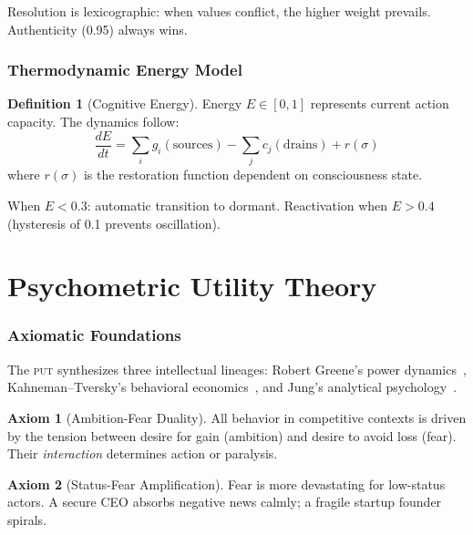 \documentclass[12pt,a4paper,twoside]{article}
\theoremstyle{plain}
\theoremstyle{definition}
\newtheorem{definition}[theorem]{Definition}
\newtheorem{axiom}{Axiom}
\theoremstyle{remark}
\newcommand{\PUT}{\textsc{put}}
\begin{document}
Resolution is lexicographic: when values conflict, the higher weight prevails. Authenticity (0.95) always wins.


\section{Thermodynamic Energy Model}

\begin{definition}[Cognitive Energy]
Energy $E \in [0,1]$ represents current action capacity. The dynamics follow:
\begin{equation}
\frac{dE}{dt} = \sum_i g_i(\text{sources}) - \sum_j c_j(\text{drains}) + r(\sigma)
\end{equation}
where $r(\sigma)$ is the restoration function dependent on consciousness state.
\end{definition}

When $E < 0.3$: automatic transition to dormant. Reactivation when $E > 0.4$ (hysteresis of 0.1 prevents oscillation).



\part{Psychometric Utility Theory}

\section{Axiomatic Foundations}

The \PUT{} synthesizes three intellectual lineages: Robert Greene's power dynamics~\citep{greene1998,greene2018}, Kahneman--Tversky's behavioral economics~\citep{kahneman1979,tversky1992}, and Jung's analytical psychology~\citep{jung1951}.

\begin{axiom}[Ambition-Fear Duality]
All behavior in competitive contexts is driven by the tension between desire for gain (ambition) and desire to avoid loss (fear). Their \emph{interaction} determines action or paralysis.
\end{axiom}

\begin{axiom}[Status-Fear Amplification]
Fear is more devastating for low-status actors. A secure CEO absorbs negative news calmly; a fragile startup founder spirals.
\end{axiom}
\end{document}
